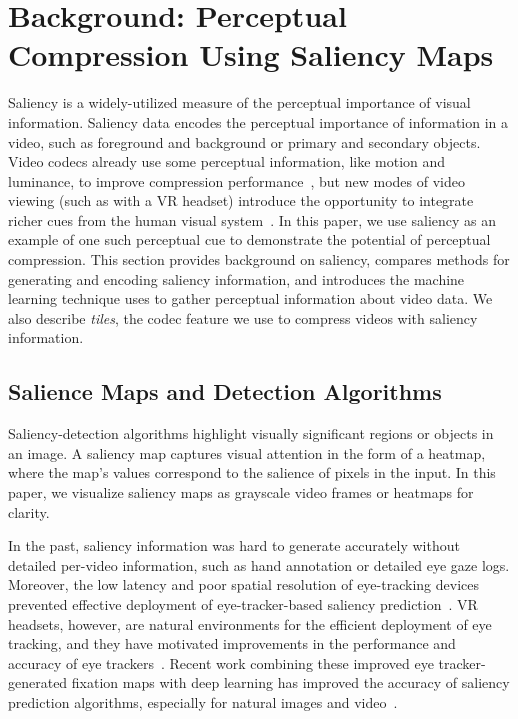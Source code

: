 
\section{Background: Perceptual Compression Using Saliency Maps}

\label{sec:saliency}
Saliency is a widely-utilized measure of the perceptual importance of visual information.
Saliency data encodes the perceptual importance of information in a video, such as foreground and background or primary and secondary objects.
Video codecs already use some perceptual information, like motion and luminance, to improve compression performance~\cite{hevc}, but new modes of video viewing (such as with a VR headset) introduce the opportunity to integrate richer cues from the human visual system~\cite{lee2012perceptualcodingsurvey}.
In this paper, we use saliency as an example of one such perceptual cue to demonstrate the potential of perceptual compression.
This section provides background on saliency, compares methods for generating and encoding saliency information, and introduces the machine learning technique \name uses to gather perceptual information about video data.
We also describe \emph{tiles}, the codec feature we use to compress videos with saliency information.

\subsection{Salience Maps and Detection Algorithms} Saliency-detection algorithms highlight visually significant regions or objects in an image.
A saliency map captures visual attention in the form of a heatmap, where the map's values correspond to the salience of pixels in the input.
In this paper, we visualize saliency maps as grayscale video frames or heatmaps for clarity.

In the past, saliency information was hard to generate accurately without detailed per-video information, such as hand annotation or detailed eye gaze logs.
Moreover, the low latency and poor spatial resolution of eye-tracking devices prevented effective deployment of eye-tracker-based saliency prediction~\cite{bulling}.
VR headsets, however, are natural environments for the efficient deployment of eye tracking, and they have motivated improvements in the performance and accuracy of eye trackers~\cite{Whitmire:2016:ESC:2971763.2971771}.
Recent work combining these improved eye tracker-generated fixation maps with deep learning has improved the accuracy of saliency prediction algorithms, especially for natural images and video~\cite{bylinskii2016saliency}.

